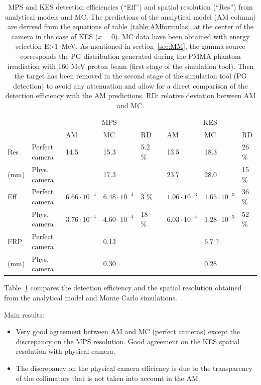 \documentclass[a4paper,english,12pt]{article}
\newcommand{\qq}[1]{\enquote{#1}}
\newcommand{\bh}[2][red]{\textcolor{#1}{#2}}
\begin{document}
\begin{table}[h]
\centering
\begin{tabular}{lllllllll}
	\midrule
	\multicolumn{2}{c}{}				& \multicolumn{3}{c}{MPS}																	&& \multicolumn{3}{c}{KES}										\\
	\cline{3-5}\cline{7-9}
	\multicolumn{2}{c}{}				& AM 										& MC 									& RD	 			&& AM 										& MC & RD							\\
	\midrule
	Res	& Perfect camera				& 14.5 								& 15.3  	 			& 5.2 \%	&& 13.5 								& 18.3 				& 26 \%  \\
	(mm)	& Phys. camera					& 					& 17.3  	 					&						&& 23.7									& 28.0 									& 15 \% \\

	\midrule
	Eff    & Perfect camera			&  $6.66 \cdot 10^{-4}$ & $6.48\cdot10^{-4}$	&	3 \%					&& $1.06 \cdot 10^{-3}$  & $1.65\cdot10^{-3}$			& 36 \%\\
	       & Phys. camera				&  $3.76 \cdot 10^{-4}$	& $4.60\cdot10^{-4}$	&	18 \%					&& $6.03 \cdot 10^{-4}$	& $1.28\cdot10^{-3}$	& 52 \%\\
 	\midrule
	FRP    & Perfect camera			&  & 0.13 	&  &&  & 6.7 	\bh{?}		& \\
	(mm)       & Phys. camera				&  & 0.30 	&  && 	& 0.28 	& \\
 	\midrule
\end{tabular}
\caption{MPS and KES detection efficiencies (\qq{Eff}) and spatial resolution (\qq{Res}) from analytical models and MC. The predictions of the analytical model (AM column) are derived from the equations of table~\ref{table:AMformulas}, at the center of the camera in the case of KES ($x=0$). MC data have been obtained with energy selection E>1~MeV. As mentioned in section~\ref{sec:MM}, the gamma source corresponds the PG distribution generated during the PMMA phantom irradiation with 160 MeV proton beam (first stage of the simulation tool). Then the target has been removed in the second stage of the simulation tool (PG detection) to avoid any attenuation and allow for a direct comparison of the detection efficiency with the AM predictions. RD: relative deviation between AM and MC.}
\label{tab:AMV}
\end{table}

Table~\ref{tab:AMV} compares the detection efficiency and the spatial resolution obtained from the analytical model and Monte Carlo simulations.

Main results:
\begin{itemize}
	\item Very good agreement between AM and MC (perfect cameras) except the discrepancy on the MPS resolution. Good agreement on the KES spatial resolution with physical camera.
	\item The discrepancy on the physical camera efficiency is due to the transparency of the collimators that is not taken into account in the AM.
\end{itemize}
\end{document}
